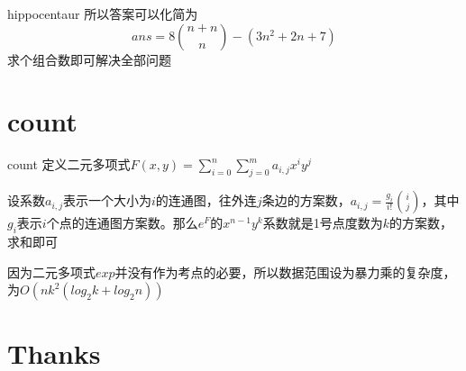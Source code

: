 \documentclass[9pt]{beamer}
\begin{document}
  \begin{frame}{hippocentaur}
     所以答案可以化简为
    \begin{equation}
      ans=8\binom{n+n}{n}-(3n^2+2n+7)
    \end{equation}
    求个组合数即可解决全部问题
  \end{frame}
  
  \section{count}

  \begin{frame}{count} 
     定义二元多项式$F(x,y)=\sum_{i=0}^n\sum_{j=0}^m a_{i,j}x^iy^j$
    
     设系数$a_{i,j}$表示一个大小为$i$的连通图，往外连$j$条边的方案数，$a_{i,j}=\frac{g_i}{i!}\binom{i}{j}$，其中$g_i$表示$i$个点的连通图方案数。那么$e^F$的$x^{n-1}y^k$系数就是1号点度数为$k$的方案数，求和即可

     因为二元多项式$exp$并没有作为考点的必要，所以数据范围设为暴力乘的复杂度，为$O(nk^2(log_2k+log_2 n))$
  \end{frame}
  
  \section{Thanks}
\end{document}
